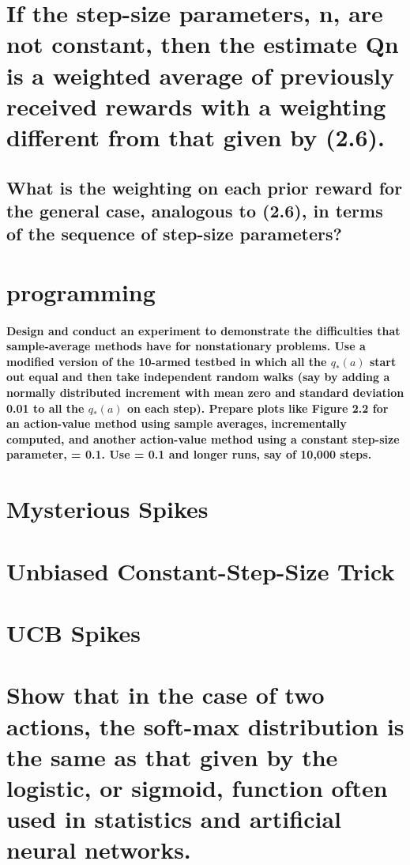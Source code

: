 \documentclass{article}
\begin{document}
\section{If the step-size parameters, \textalpha n, are not constant, then the estimate Qn is a weighted average of previously received rewards with a weighting different from that given by (2.6).}
\subsection{What is the weighting on each prior reward for the general case, analogous to (2.6), in terms of the sequence of step-size parameters?}

\section{programming}
\paragraph{Design and conduct an experiment to demonstrate the difficulties that sample-average methods have for nonstationary problems. Use a modified version of the 10-armed testbed in which all the $q_*(a)$ start out equal and then take independent random walks (say by adding a normally distributed increment with mean zero and standard deviation 0.01 to all the $q_*(a)$ on each step). Prepare plots like Figure 2.2 for an action-value method using sample averages, incrementally computed, and another action-value method using a constant step-size parameter, \textalpha \thickspace = 0.1. Use \textepsilon \thickspace = 0.1 and longer runs, say of 10,000 steps.}

\section{Mysterious Spikes}

\section{Unbiased Constant-Step-Size Trick}

\section{UCB Spikes}

\section{Show that in the case of two actions, the soft-max distribution is the same as that given by the logistic, or sigmoid, function often used in statistics and artificial neural networks.}
\end{document}
